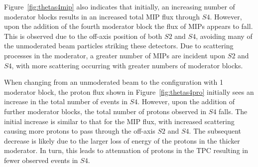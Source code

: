 Figure~\ref{fig:thetas4mip} also indicates that initially, an increasing number of moderator blocks results in an increased total MIP flux through $\mathit{S4}$. 
However, upon the addition of the fourth moderator block the flux of MIPs appears to fall.
This is observed due to the off-axis position of both $\mathit{S2}$ and $\mathit{S4}$, avoiding many of the unmoderated beam particles striking these detectors.
Due to scattering processes in the moderator, a greater number of MIPs are incident upon $\mathit{S2}$ and $\mathit{S4}$, with more scattering occurring with greater numbers of moderator blocks.

When changing from an unmoderated beam to the configuration with 1 moderator block, the proton flux shown in Figure~\ref{fig:thetas4pro} initially sees an increase in the total number of events in $\mathit{S4}$.
However, upon the addition of further moderator blocks, the total number of protons observed in $\mathit{S4}$ falls.
The initial increase is similar to that for the MIP flux, with increased scattering causing more protons to pass through the off-axis $\mathit{S2}$ and $\mathit{S4}$.
The subsequent decrease is likely due to the larger loss of energy of the protons in the thicker moderator.
In turn, this leads to attenuation of protons in the TPC resulting in fewer observed events in $\mathit{S4}$.

